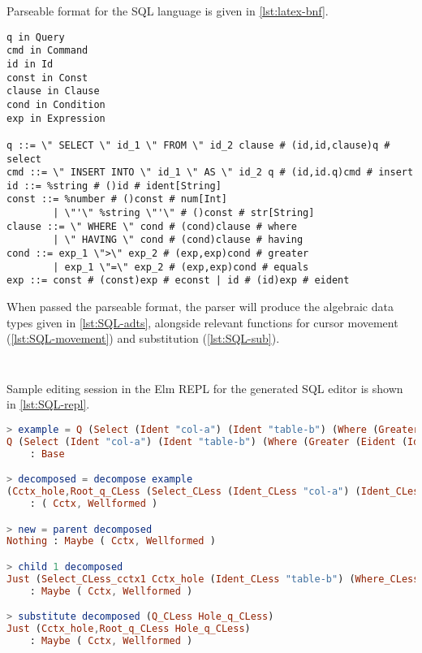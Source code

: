 Parseable format for the SQL language is given in \cref{lst:latex-bnf}.

\begin{lstlisting}[style=inline, caption={Parseable format of the SQL language syntax}, label={lst:SQL-bnf}]
q in Query
cmd in Command
id in Id
const in Const
clause in Clause
cond in Condition
exp in Expression

q ::= \" SELECT \" id_1 \" FROM \" id_2 clause # (id,id,clause)q # select
cmd ::= \" INSERT INTO \" id_1 \" AS \" id_2 q # (id,id.q)cmd # insert
id ::= %string # ()id # ident[String]
const ::= %number # ()const # num[Int] 
        | \"'\" %string \"'\" # ()const # str[String]
clause ::= \" WHERE \" cond # (cond)clause # where 
        | \" HAVING \" cond # (cond)clause # having
cond ::= exp_1 \">\" exp_2 # (exp,exp)cond # greater 
        | exp_1 \"=\" exp_2 # (exp,exp)cond # equals
exp ::= const # (const)exp # econst | id # (id)exp # eident
\end{lstlisting}

When passed the parseable format, the parser will produce the algebraic data types
given in \cref{lst:SQL-adts}, alongside relevant functions for cursor movement (\cref{lst:SQL-movement})
and substitution (\cref{lst:SQL-sub}).

\begin{lstlisting}[style=inline, language=elm, caption={Generated ADT for the SQL language}, label={lst:SQL-adts}]

\end{lstlisting}

\begin{lstlisting}[style=inline, language=elm, caption={Generated functions for cursor movement for the SLQ language}, label={lst:SQL-movement}]
\end{lstlisting}

Sample editing session in the Elm REPL for the generated SQL editor is
shown in \cref{lst:SQL-repl}.

\begin{lstlisting}[style=inline, language=elm, caption={Elm REPL demonstration of the SQL editor}, label={lst:SQL-repl}]
> example = Q (Select (Ident "col-a") (Ident "table-b") (Where (Greater (Eident (Ident "col-a")) (Econst (Num 2)))))
Q (Select (Ident "col-a") (Ident "table-b") (Where (Greater (Eident (Ident "col-a")) (Econst (Num 2)))))
    : Base

> decomposed = decompose example
(Cctx_hole,Root_q_CLess (Select_CLess (Ident_CLess "col-a") (Ident_CLess "table-b") (Where_CLess (Greater_CLess (Eident_CLess (Ident_CLess "col-a")) (Econst_CLess (Num_CLess 2))))))
    : ( Cctx, Wellformed )

> new = parent decomposed
Nothing : Maybe ( Cctx, Wellformed )

> child 1 decomposed
Just (Select_CLess_cctx1 Cctx_hole (Ident_CLess "table-b") (Where_CLess (Greater_CLess (Eident_CLess (Ident_CLess "col-a")) (Econst_CLess (Num_CLess 2)))),Root_id_CLess (Ident_CLess "col-a"))
    : Maybe ( Cctx, Wellformed )

> substitute decomposed (Q_CLess Hole_q_CLess)
Just (Cctx_hole,Root_q_CLess Hole_q_CLess)
    : Maybe ( Cctx, Wellformed )
\end{lstlisting}

